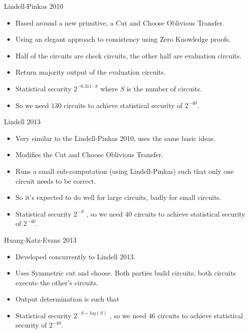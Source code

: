 \documentclass[t, 12pt]{beamer}            %
\begin{document}
\begin{frame}{Lindell-Pinkas 2010}
	\begin{itemize}[<+->]
		\item Based around a new primitive, a Cut and Choose Oblivious Transfer.
		\item Using an elegant approach to consistency using Zero Knowledge proofs.
		\item Half of the circuits are check circuits, the other half are evaluation circuits.
		\item Return majority output of the evaluation circuits.
		\item Statistical security $2^{-0.311 \cdot S}$  where $S$ is the number of circuits.
		\item So we need $130$ circuits to achieve statistical security of $2^{-40}$.
	\end{itemize}

\end{frame}


\begin{frame}{Lindell 2013}
	\begin{itemize}[<+->]
		\item Very similar to the Lindell-Pinkas 2010, uses the same basic ideas.
		\item Modifies the Cut and Choose Oblivious Transfer.
		\item Runs a small sub-computation (using Lindell-Pinkas) such that only one circuit needs to be correct.
		\item So it's expected to do well for large circuits, badly for small circuits.
		\item Statistical security $2^{-S}$ , so we need $40$ circuits to achieve statistical security of $2^{-40}$.
	\end{itemize}

\end{frame}


\begin{frame}{Huang-Katz-Evans 2013}
	\begin{itemize}[<+->]
		\item Developed concurrently to Lindell 2013.
		\item Uses Symmetric cut and choose. Both parties build circuits, both circuits execute the other's circuits.
		\item Output determination is such that 
		\item Statistical security $2^{-S + log(S)}$ , so we need $46$ circuits to achieve statistical security of $2^{-40}$.
	\end{itemize}

\end{frame}
\end{document}
